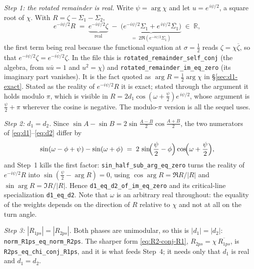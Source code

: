 \documentclass[11pt]{article}
\theoremstyle{definition}
\begin{document}
\emph{Step 1: the rotated remainder is real.} Write $\psi=\arg\chi$ and let
$u=e^{\,i\psi/2}$, a square root of $\chi$. With $R=\zeta-\Sigma_1-\Sigma_2$,
\begin{equation}\label{eq:lean-hinge}
e^{-i\psi/2}R
\;=\;
\underbrace{e^{-i\psi/2}\zeta}_{\text{real}}
\;-\;
\underbrace{\bigl(e^{-i\psi/2}\Sigma_1+e^{\,i\psi/2}\overline{\Sigma_1}\bigr)}_{=\;2\Re\left(e^{-i\psi/2}\Sigma_1\right)}
\;\in\;\mathbb{R},
\end{equation}
the first term being real because the functional equation at $\sigma=\tfrac12$
reads $\zeta=\chi\overline{\zeta}$, so that
$e^{-i\psi/2}\zeta=\overline{e^{-i\psi/2}\zeta}$. In the file this is
\texttt{rotated\_remainder\_self\_conj} (the algebra, from $u\bar u=1$ and
$u^2=\chi$) and \texttt{rotated\_remainder\_im\_eq\_zero} (its imaginary part
vanishes). It is the fact quoted as $\arg R=\tfrac12\arg\chi$ in
\S\ref{sec:d1-exact}. Stated as the reality of $e^{-i\psi/2}R$ it is exact;
stated through the argument it holds modulo $\pi$, which is visible in
$R=2d_1\cos(\omega+\tfrac\psi2)e^{\,i\psi/2}$, whose argument is
$\tfrac\psi2+\pi$ wherever the cosine is negative. The modulo-$\pi$ version is
all the sequel uses.

\emph{Step 2: $d_1=d_2$.} Since $\sin A-\sin B=2\sin\frac{A-B}{2}\cos\frac{A+B}{2}$,
the two numerators of \eqref{eq:d1}--\eqref{eq:d2} differ by
\begin{equation}\label{eq:lean-numerators}
\sin(\omega-\phi+\psi)-\sin(\omega+\phi)
\;=\;
2\,\sin\!\Bigl(\frac{\psi}{2}-\phi\Bigr)\cos\!\Bigl(\omega+\frac{\psi}{2}\Bigr),
\end{equation}
and Step~1 kills the first factor: \texttt{sin\_half\_sub\_arg\_eq\_zero} turns
the reality of $e^{-i\psi/2}R$ into $\sin(\tfrac\psi2-\arg R)=0$, using
$\cos\arg R=\Re R/|R|$ and $\sin\arg R=\Im R/|R|$. Hence
\texttt{d1\_eq\_d2\_of\_im\_eq\_zero} and its critical-line specialization
\texttt{d1\_eq\_d2}. Note that $\omega$ is an arbitrary real throughout: the
equality of the weights depends on the direction of $R$ relative to $\chi$ and
not at all on the turn angle.

\emph{Step 3: $|R_{1ps}|=|R_{2ps}|$.} Both phases are unimodular, so this is
$|d_1|=|d_2|$: \texttt{norm\_R1ps\_eq\_norm\_R2ps}. The sharper form
\eqref{eq:R2-conj-R1}, $R_{2ps}=\chi\,\overline{R_{1ps}}$, is
\texttt{R2ps\_eq\_chi\_conj\_R1ps}, and it is what feeds Step~4; it needs only
that $d_1$ is real and $d_1=d_2$.
\end{document}

